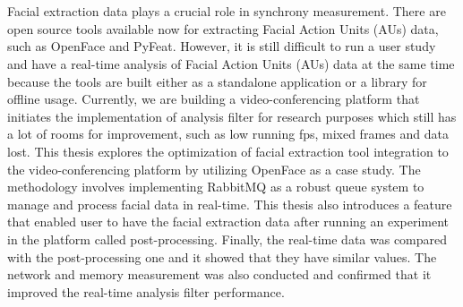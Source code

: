 \chapter{\abstractname}

Facial extraction data plays a crucial role in synchrony measurement. 
There are open source tools available now for extracting Facial Action Units (AUs) data,
 such as OpenFace and PyFeat.
However, it is still difficult to run a user study and have a real-time analysis of Facial Action Units (AUs) data
at the same time because the tools are built either as a standalone application 
or a library for offline usage.
Currently, we are building a video-conferencing platform that 
initiates the implementation of analysis filter
for research purposes which still has a lot of rooms for improvement, 
such as low running fps, mixed frames and data lost.
This thesis explores the optimization of facial extraction tool integration 
to the video-conferencing platform by utilizing OpenFace as a case study.
The methodology involves implementing RabbitMQ as a robust queue system to manage and process facial data in real-time.
This thesis also introduces a feature that 
enabled user to have the facial extraction data after running an experiment in the platform called post-processing.
Finally, the real-time data was compared with the post-processing one 
and it showed that they have similar values.
The network and memory measurement was also conducted and confirmed that it improved the real-time analysis filter performance.

